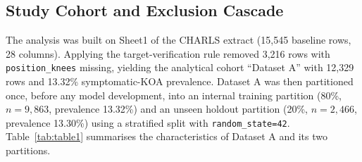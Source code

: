 \documentclass[11pt,a4paper]{article}
\begin{document}
\subsection{Study Cohort and Exclusion Cascade}
The analysis was built on Sheet1 of the CHARLS extract (15{,}545 baseline rows, 28 columns). Applying
the target-verification rule removed 3{,}216 rows with \texttt{position\_knees} missing, yielding the
analytical cohort ``Dataset A'' with 12{,}329 rows and 13.32\% symptomatic-KOA prevalence. Dataset A
was then partitioned once, before any model development, into an internal training partition
(80\%, $n=9{,}863$, prevalence 13.32\%) and an unseen holdout partition (20\%, $n=2{,}466$, prevalence
13.30\%) using a stratified split with \texttt{random\_state=42}. Table~\ref{tab:table1} summarises
the characteristics of Dataset A and its two partitions.
\end{document}
